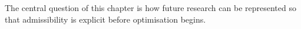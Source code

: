The central question of this chapter is how future research can be represented so that admissibility is explicit before optimisation begins.
